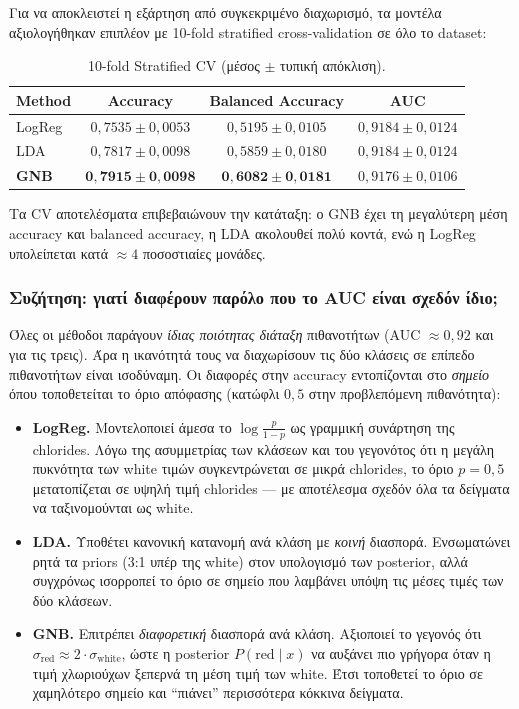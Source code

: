 \documentclass[11pt,a4paper]{article}
\begin{document}
Για να αποκλειστεί η εξάρτηση από συγκεκριμένο διαχωρισμό, τα μοντέλα
αξιολογήθηκαν επιπλέον με 10-fold stratified cross-validation σε όλο
το dataset:

\begin{table}[h!]
\centering
\caption{10-fold Stratified CV (μέσος $\pm$ τυπική απόκλιση).}
\begin{tabular}{lccc}
\toprule
Method & Accuracy & Balanced Accuracy & AUC \\
\midrule
LogReg      & $0{,}7535 \pm 0{,}0053$ & $0{,}5195 \pm 0{,}0105$
            & $0{,}9184 \pm 0{,}0124$ \\
LDA         & $0{,}7817 \pm 0{,}0098$ & $0{,}5859 \pm 0{,}0180$
            & $0{,}9184 \pm 0{,}0124$ \\
\textbf{GNB} & $\mathbf{0{,}7915 \pm 0{,}0098}$
            & $\mathbf{0{,}6082 \pm 0{,}0181}$
            & $0{,}9176 \pm 0{,}0106$ \\
\bottomrule
\end{tabular}
\end{table}

Τα CV αποτελέσματα επιβεβαιώνουν την κατάταξη: ο GNB έχει τη μεγαλύτερη
μέση accuracy και balanced accuracy, η LDA ακολουθεί πολύ κοντά, ενώ η
LogReg υπολείπεται κατά $\approx 4$ ποσοστιαίες μονάδες.

\subsubsection*{Συζήτηση: γιατί διαφέρουν παρόλο που το AUC είναι σχεδόν ίδιο;}

Όλες οι μέθοδοι παράγουν \emph{ίδιας ποιότητας διάταξη} πιθανοτήτων
(AUC $\approx 0{,}92$ και για τις τρεις). Άρα η ικανότητά τους να
διαχωρίσουν τις δύο κλάσεις σε επίπεδο πιθανοτήτων είναι ισοδύναμη.
Οι διαφορές στην accuracy εντοπίζονται στο \emph{σημείο} όπου τοποθετείται
το όριο απόφασης (κατώφλι $0{,}5$ στην προβλεπόμενη πιθανότητα):

\begin{itemize}[leftmargin=1.5cm]
    \item \textbf{LogReg.} Μοντελοποιεί άμεσα το $\log\!\frac{p}{1-p}$ ως
    γραμμική συνάρτηση της chlorides. Λόγω της ασυμμετρίας των κλάσεων
    και του γεγονότος ότι η μεγάλη πυκνότητα των white τιμών συγκεντρώνεται
    σε μικρά chlorides, το όριο $p=0{,}5$ μετατοπίζεται σε υψηλή τιμή
    chlorides — με αποτέλεσμα σχεδόν όλα τα δείγματα να ταξινομούνται
    ως white.
    \item \textbf{LDA.} Υποθέτει κανονική κατανομή ανά κλάση με
    \emph{κοινή} διασπορά. Ενσωματώνει ρητά τα priors (3:1 υπέρ της
    white) στον υπολογισμό των posterior, αλλά συγχρόνως ισορροπεί
    το όριο σε σημείο που λαμβάνει υπόψη τις μέσες τιμές των δύο κλάσεων.
    \item \textbf{GNB.} Επιτρέπει \emph{διαφορετική} διασπορά ανά κλάση.
    Αξιοποιεί το γεγονός ότι $\sigma_{\text{red}} \approx 2 \cdot
    \sigma_{\text{white}}$, ώστε η posterior $P(\text{red}\mid x)$
    να αυξάνει πιο γρήγορα όταν η τιμή χλωριούχων ξεπερνά τη μέση τιμή
    των white. Έτσι τοποθετεί το όριο σε χαμηλότερο σημείο και ``πιάνει''
    περισσότερα κόκκινα δείγματα.
\end{itemize}
\end{document}
